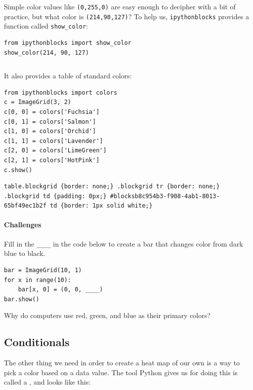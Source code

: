 \documentclass{book}
\begin{document}
Simple color values like \texttt{(0,255,0)} are easy enough to decipher
with a bit of practice, but what color is \texttt{(214,90,127)}? To help
us, \texttt{ipythonblocks} provides a function called
\texttt{show\_color}:

\begin{verbatim}
from ipythonblocks import show_color
show_color(214, 90, 127)
\end{verbatim}

\begin{verbatim}
\end{verbatim}

It also provides a table of standard colors:

\begin{verbatim}
from ipythonblocks import colors
c = ImageGrid(3, 2)
c[0, 0] = colors['Fuchsia']
c[0, 1] = colors['Salmon']
c[1, 0] = colors['Orchid']
c[1, 1] = colors['Lavender']
c[2, 0] = colors['LimeGreen']
c[2, 1] = colors['HotPink']
c.show()
\end{verbatim}

\begin{verbatim}
table.blockgrid {border: none;} .blockgrid tr {border: none;} .blockgrid td {padding: 0px;} #blocksb8c954b3-f908-4ab1-8013-65bf49ec1b2f td {border: 1px solid white;}
\end{verbatim}

\mbox{}\paragraph{Challenges}

\begin{swcenumerate}
\item
  Fill in the \texttt{\_\_\_\_} in the code below to create a bar that
  changes color from dark blue to black.

\begin{verbatim}
bar = ImageGrid(10, 1)
for x in range(10):
    bar[x, 0] = (0, 0, ____)
bar.show()
\end{verbatim}
\item
  Why do computers use red, green, and blue as their primary colors?
\end{swcenumerate}

\subsection{Conditionals}

The other thing we need in order to create a heat map of our own is a
way to pick a color based on a data value. The tool Python gives us for
doing this is called a , and looks like this:
\end{document}
